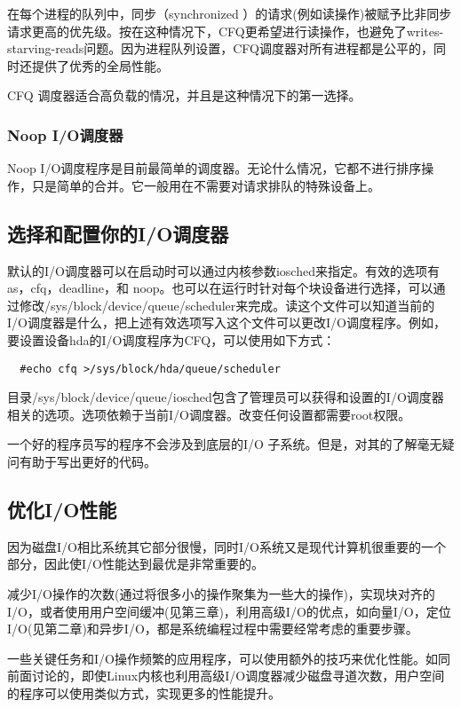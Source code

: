 在每个进程的队列中，同步（synchronized ）的请求(例如读操作)被赋予比非同步请求更高的优先级。按在这种情况下，CFQ更希望进行读操作，也避免了writes-starving-reads问题。因为进程队列设置，CFQ调度器对所有进程都是公平的，同时还提供了优秀的全局性能。

CFQ 调度器适合高负载的情况，并且是这种情况下的第一选择。

\subsubsection{Noop I/O调度器}

Noop I/O调度程序是目前最简单的调度器。无论什么情况，它都不进行排序操作，只是简单的合并。它一般用在不需要对请求排队的特殊设备上。

\subsection{选择和配置你的I/O调度器}

默认的I/O调度器可以在启动时可以通过内核参数iosched来指定。有效的选项有as，cfq，deadline，和 noop。也可以在运行时针对每个块设备进行选择，可以通过修改/sys/block/device/queue/scheduler来完成。读这个文件可以知道当前的I/O调度器是什么，把上述有效选项写入这个文件可以更改I/O调度程序。例如，要设置设备hda的I/O调度程序为CFQ，可以使用如下方式：

\begin{verbatim}
  #echo cfq >/sys/block/hda/queue/scheduler
 \end{verbatim}

目录/sys/block/device/queue/iosched包含了管理员可以获得和设置的I/O调度器相关的选项。选项依赖于当前I/O调度器。改变任何设置都需要root权限。

一个好的程序员写的程序不会涉及到底层的I/O 子系统。但是，对其的了解毫无疑问有助于写出更好的代码。

\subsection{优化I/O性能}

因为磁盘I/O相比系统其它部分很慢，同时I/O系统又是现代计算机很重要的一个部分，因此使I/O性能达到最优是非常重要的。

减少I/O操作的次数(通过将很多小的操作聚集为一些大的操作)，实现块对齐的I/O，或者使用用户空间缓冲(见第三章)，利用高级I/O的优点，如向量I/O，定位I/O(见第二章)和异步I/O，都是系统编程过程中需要经常考虑的重要步骤。

一些关键任务和I/O操作频繁的应用程序，可以使用额外的技巧来优化性能。如同前面讨论的，即使Linux内核也利用高级I/O调度器减少磁盘寻道次数，用户空间的程序可以使用类似方式，实现更多的性能提升。

